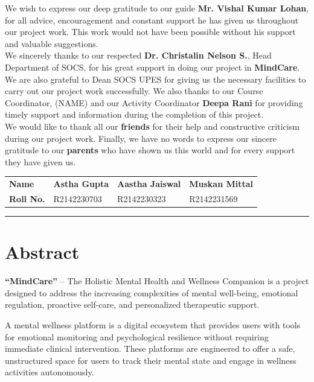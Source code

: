 \documentclass[a4paper,12pt]{report}
\begin{document}
We wish to express our deep gratitude to our guide \textbf{Mr. Vishal Kumar Lohan}, for all advice, encouragement and constant support he has given us throughout our project work. This work would not have been possible without his support and valuable suggestions.\\

We sincerely thanks to our respected \textbf{Dr. Christalin Nelson S.}, Head Department of SOCS, for his great support in doing our project in \textbf{MindCare}. \\

We are also grateful to Dean SOCS UPES for giving us the necessary facilities to carry out our project work successfully. We also thanks to our Course Coordinator, (NAME) and our Activity Coordinator \textbf{Deepa Rani} for providing timely support and information during the completion of this project. \\ 

We would like to thank all our \textbf{friends} for their help and constructive criticism during our project work. Finally, we have no words to express our sincere gratitude to our \textbf{parents} who have shown us this world and for every support they have given us.

\vspace{3cm}

\begin{tabular}{l l l l}
    \textbf{Name} & \textbf{Astha Gupta} & \textbf{Aastha Jaiswal} & \textbf{Muskan Mittal} \\ 
    \textbf{Roll No.} & R2142230703 & R2142230323 & R2142231569 \\
\end{tabular}

\vfill
\hrule

\chapter*{\centering Abstract}
\textbf{``MindCare''} -- The Holistic Mental Health and Wellness Companion is a project designed to address the increasing complexities of mental well-being, emotional regulation, proactive self-care, and personalized therapeutic support.

A mental wellness platform is a digital ecosystem that provides users with tools for emotional monitoring and psychological resilience without requiring immediate clinical intervention. These platforms are engineered to offer a safe, unstructured space for users to track their mental state and engage in wellness activities autonomously.
\end{document}
